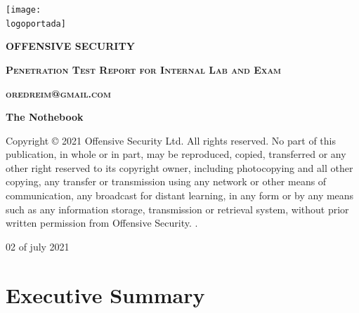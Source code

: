 \documentclass[a4paper]{article}
\newcommand{\logoportada}{imagenes/offensive-security-logo.png} %
\newcommand{\machinename}{The Nothebook} %
\newcommand{\startdate}{02 of july 2021}
\begin{document}

    \begin{titlepage}
        \centering
            \texttt{[image: \\logoportada]}\par\vspace{1cm}
            \vfill
            {\scshape\LARGE \textbf{OFFENSIVE SECURITY}} \par\vspace{1cm}
            \vfill
            {\scshape\LARGE \textbf{Penetration Test Report for Internal Lab and Exam}} \par\vspace{1cm}
            \vfill
            {\scshape\LARGE \textbf{oredreim@gmail.com}} \par\vspace{1cm}
            \vfill
            {\Huge\bfseries\textcolor{greenPortada}{\machinename}}
            \vfill
            \vfill
            \begin{tcolorbox}[colback=red!5!white,colframe=red!75!black]
                \centering
                Copyright © 2021 Offensive Security Ltd. All rights reserved.
                No part of this publication, in whole or in part, may be reproduced, copied, transferred or any other right reserved to its copyright owner, including photocopying and all other copying, any transfer or transmission using any network or other means of communication, any broadcast for distant learning, in any form or by any means such as any information storage, transmission or retrieval system, without prior written permission from Offensive Security.
                .
            \end{tcolorbox}
            \vfill
            \vfill
            {\large \startdate\par}
            \vfill
    \end{titlepage}


    \clearpage
    \tableofcontents
    \clearpage
    \section{Executive Summary}
\end{document}
